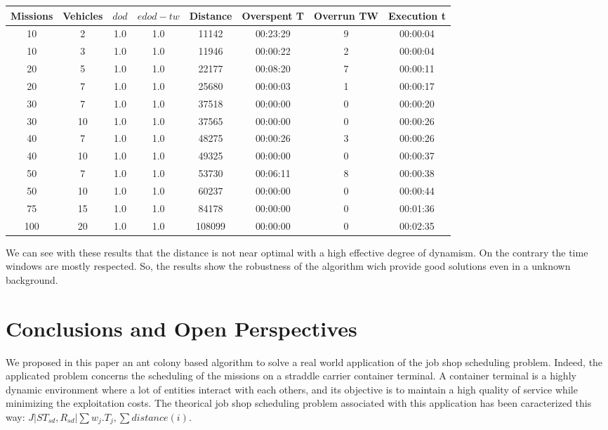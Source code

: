 \documentclass[a4paper,12pt]{article}
\begin{document}
  \small
  \begin{center}
    \begin{tabular}{|c|c|c|c|c|c|c|c|} 
    \hline
    \bf{Missions} & \bf{Vehicles} & \bf{$dod$} & \bf{$edod-tw$} & \bf{Distance} & \bf{Overspent T} & \bf{Overrun TW} &  \bf{Execution t} \\ \hline
    10	 & 2 	& 1.0	& 1.0	& 11142	& 00:23:29	& 9	& 00:00:04\\
    10	 & 3 	& 1.0	& 1.0	& 11946	& 00:00:22	& 2	& 00:00:04\\
    20	 & 5 	& 1.0	& 1.0	& 22177	& 00:08:20	& 7	& 00:00:11\\
    20	 & 7 	& 1.0	& 1.0	& 25680	& 00:00:03	& 1	& 00:00:17\\
    30	 & 7 	& 1.0	& 1.0	& 37518	& 00:00:00	& 0	& 00:00:20\\
    30	 & 10 	& 1.0	& 1.0	& 37565	& 00:00:00	& 0	& 00:00:26\\
    40	 & 7 	& 1.0	& 1.0	& 48275	& 00:00:26	& 3	& 00:00:26\\
    40	 & 10 	& 1.0	& 1.0	& 49325	& 00:00:00	& 0	& 00:00:37\\
    50	 & 7 	& 1.0	& 1.0	& 53730	& 00:06:11	& 8	& 00:00:38\\
    50	 & 10 	& 1.0	& 1.0	& 60237	& 00:00:00	& 0	& 00:00:44\\
    75	 & 15 	& 1.0	& 1.0	& 84178	& 00:00:00	& 0	& 00:01:36\\
    100	 & 20 	& 1.0	& 1.0	& 108099& 00:00:00	& 0	& 00:02:35\\
    \hline
    \end{tabular}
  \end{center}
  \normalsize

We can see with these results that the distance is not near optimal with a high effective degree of dynamism. On the contrary the time windows are mostly respected. So, the results show the robustness of the algorithm wich provide good solutions even in a unknown background.



\section{Conclusions and Open Perspectives}

We proposed in this paper an ant colony based algorithm to solve a real world application of the job shop scheduling problem. Indeed, the applicated problem concerns the scheduling of the missions on a straddle carrier container terminal. A container terminal is a highly dynamic environment where a lot of entities interact with each others, and its objective is to maintain a high quality of service while minimizing the exploitation costs. The theorical job shop scheduling problem associated with this application has been caracterized this way: ${ J|ST_{sd}, R_{sd}|\sum w_j.T_{j} , \sum distance(i)}$.\\
\end{document}
